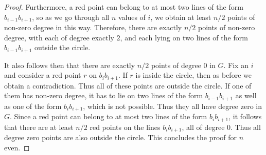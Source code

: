 \documentclass[10pt,a4paper]{amsart}
\begin{document}
\begin{proof}
Furthermore, a red point can belong to at most two lines of the form $b_{i-1}b_{i+1}$, so as we go through all $n$ values of $i$, we obtain at least $n/2$ points of non-zero degree in this way.
Therefore, there are exactly $n/2$ points of non-zero degree, with each of degree exactly $2$, and each lying on two lines of the form $b_{i-1}b_{i+1}$ outside the circle.

It also follows then that there are exactly $n/2$ points of degree $0$ in $G$.
Fix an $i$ and consider a red point $r$ on $b_ib_{i+1}$.
If $r$ is inside the circle, then as before we obtain a contradiction.
Thus all of these points are outside the circle.
If one of them has non-zero degree, it has to lie on two lines of the form $b_{i-1}b_{i+1}$ as well as one of the form $b_ib_{i+1}$, which is not possible.
Thus they all have degree zero in $G$.
Since a red point can belong to at most two lines of the form $b_ib_{i+1}$, it follows that there are at least $n/2$ red points on the lines $b_ib_{i+1}$, all of degree $0$.
Thus all degree zero points are also outside the circle.
This concludes the proof for $n$ even.
\end{proof}
\end{document}
